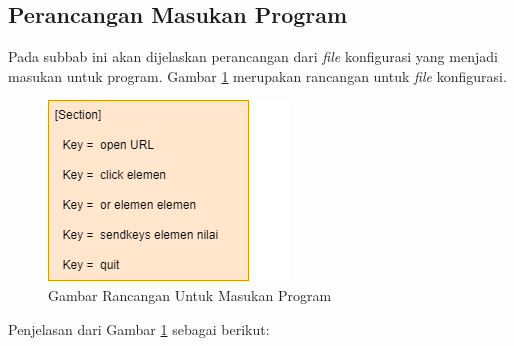 \subsection{Perancangan Masukan Program}
\label{sec:spek}
Pada subbab ini akan dijelaskan perancangan dari \textit{file} konfigurasi yang menjadi masukan untuk program. Gambar \ref{fig:spek} merupakan rancangan untuk \textit{file} konfigurasi.
\begin{figure}[H]
	\centering
	\includegraphics[scale=0.7]{Gambar/strukturConf.png}
	\caption{Gambar Rancangan Untuk Masukan Program} 
	\label{fig:spek}
\end{figure}
Penjelasan dari Gambar \ref{fig:spek} sebagai berikut:
